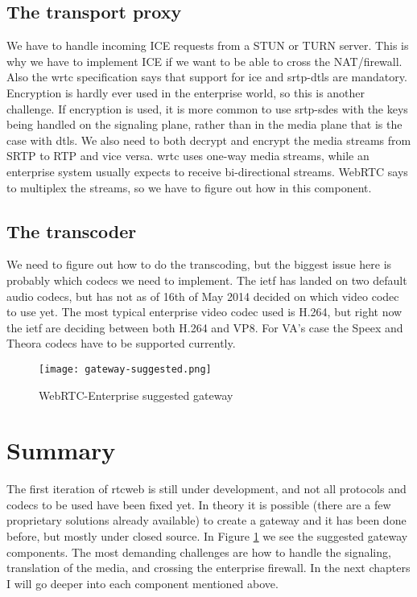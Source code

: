 \subsection{The transport proxy}
We have to handle incoming ICE requests from a STUN or TURN server. This is why we have to implement ICE if we want to be able to cross the NAT/firewall. Also the \gls{wrtc} specification says that support for \gls{ice} and \gls{srtp}-\gls{dtls} are mandatory. Encryption is hardly ever used in the enterprise world, so this is another challenge. If encryption is used, it is more common to use \gls{srtp}-\gls{sdes} with the keys being handled on the signaling plane, rather than in the media plane that is the case with \gls{dtls}. We also need to both decrypt and encrypt the media streams from SRTP to RTP and vice versa. \gls{wrtc} uses one-way media streams, while an enterprise system usually expects to receive bi-directional streams. WebRTC says to multiplex the streams, so we have to figure out how in this component.

\subsection{The transcoder}
We need to figure out how to do the transcoding, but the biggest issue here is probably which codecs we need to implement. The \gls{ietf} has landed on two default audio codecs, but has not as of 16th of May 2014 decided on which video codec to use yet. The most typical enterprise video codec used is H.264, but right now the \gls{ietf} are deciding between both H.264 and VP8. For VA's case the Speex and Theora codecs have to be supported currently.
\\
\begin{figure}[here]
\centerline{\texttt{[image: gateway-suggested.png]}}
\caption{WebRTC-Enterprise suggested gateway}
\label{fig:gateway}
\end{figure}

\section{Summary}
The first iteration of \gls{rtcweb} is still under development, and not all protocols and codecs to be used have been fixed yet. In theory it is possible (there are a few proprietary solutions already available) to create a gateway and it has been done before, but mostly under closed source. In Figure \ref{fig:gateway} we see the suggested gateway components. The most demanding challenges are how to handle the signaling, translation of the media, and crossing the enterprise firewall. In the next chapters I will go deeper into each component mentioned above.
